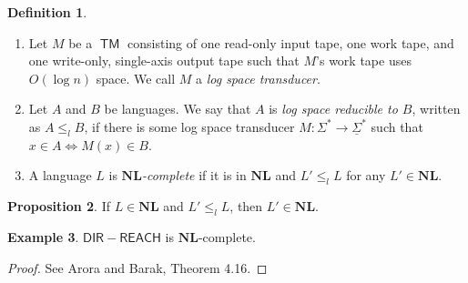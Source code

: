 \documentclass[10pt,letterpaper,cm]{nupset}
\theoremstyle{definition}
\newtheorem{definition}{Definition}[subsection]
\newtheorem{exmp}[definition]{Example}
\theoremstyle{theorem}
\newtheorem{prop}[definition]{Proposition}
\theoremstyle{remark}
\newcommand{\1}{\mathbf{1}}
\newcommand{\0}{\vec 0}
\DeclareMathOperator{\TM}{\mathsf{TM}}
\begin{document}
\begin{definition} $ $
\begin{enumerate}
\item
Let $M$ be a $\TM$ consisting of one read-only input tape, one work tape, and one write-only, single-axis output tape such that $M$'s work tape uses $O(\log{n})$ space. We call $M$ a \textit{log space transducer}.
\item Let $A$ and $B$ be languages. We say that $A$ is \textit{log space reducible to $B$}, written as $A\leq_l B$, if there is some log space transducer $M: \Sigma^{\ast} \to \underline{\Sigma}^{\ast}$ such that $x \in A \iff M(x) \in B$. 
\item A language $L$ is \textit{$\mathbf{NL}$-complete} if it is in $\mathbf{NL}$ and $L' \leq_l L$ for any $L' \in \mathbf{NL}$.
\end{enumerate}
\end{definition}

\begin{prop}
If $L \in \mathbf{NL}$ and $L' \leq_l L$, then  $L' \in \mathbf{NL}$.
\end{prop}

\begin{exmp}
$\mathsf{DIR{-}REACH}$ is $\mathbf{NL}$-complete. 
\end{exmp}
\begin{proof}
See Arora and Barak, Theorem 4.16.
\end{proof}
\end{document}
